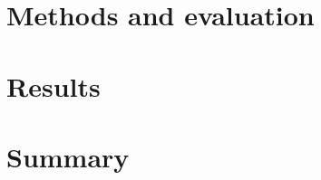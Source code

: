 \documentclass[runningheads]{llncs}
\begin{document}
\section{Methods and evaluation}

\section{Results}

\section{Summary}


%
%
%
% 
% 

\end{document}
